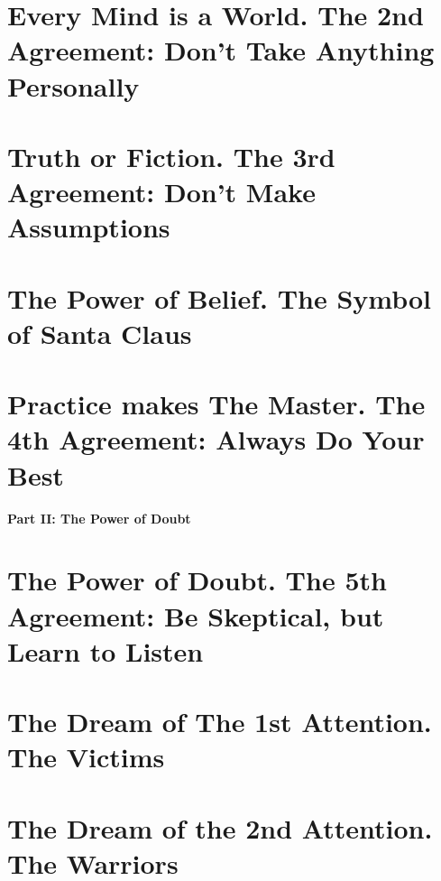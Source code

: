 \documentclass{article}
\numberwithin{equation}{section}
\begin{document}
\section{Every Mind is a World. The 2nd Agreement: Don't Take Anything Personally}


\section{Truth or Fiction. The 3rd Agreement: Don't Make Assumptions}


\section{The Power of Belief. The Symbol of Santa Claus}


\section{Practice makes The Master. The 4th Agreement: Always Do Your Best}


\begin{center}\Large\bf
	Part II: The Power of Doubt
\end{center}

\section{The Power of Doubt. The 5th Agreement: Be Skeptical, but Learn to Listen}


\section{The Dream of The 1st Attention. The Victims}


\section{The Dream of the 2nd Attention. The Warriors}
\end{document}
